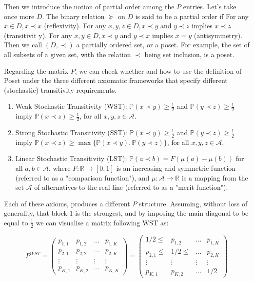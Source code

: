 \documentclass[11pt]{amsart}
\begin{document}
Then we introduce the notion of partial order among the $P$ entries. Let's take once more $D$. The binary relation $\succeq$ on $D$ is said to be a partial order if 
For any $x \in D, x \prec x$ (reflexivity).
For any $x, y, z \in D, x \prec y$ and $y \prec z$ implies $x \prec z$ (transitivit
y).
For any $x, y \in D, x \prec y$ and $y \prec x$ implies $x=y$ (antisymmetry).
Then we call $(D, \prec)$ a partially ordered set, or a poset. For example, the set of all subsets of a given set, with the relation $\prec$ being set inclusion, is a poset.

Regarding the matrix $P$, we can check whether and how to use the definition of Poset under the three different axiomatic frameworks that specify different (stochastic) transitivity requirements.

\begin{enumerate}
\item Weak Stochastic Transitivity (WST): $\mathbb{P}(x \prec y) \geq \frac{1}{2}$ and $\mathbb{P}(y \prec z) \geq \frac{1}{2}$ imply $\mathbb{P}(x \prec z) \geq \frac{1}{2}$, for all $x, y, z \in \mathcal{A}$.

\item Strong Stochastic Transitivity (SST): $\mathbb{P}(x \prec y) \geq \frac{1}{2}$ and $\mathbb{P}(y \prec z) \geq \frac{1}{2}$ imply $\mathbb{P}(x \prec z) \geq \max \{\mathbb{P}(x \prec y), \mathbb{P}(y \prec z)\}$, for all $x, y, z \in \mathcal{A}$.

\item Linear Stochastic Transitivity (LST): $\mathbb{P}(a \prec b) = F(\mu(a) - \mu(b))$ for all $a, b \in \mathcal{A}$, where $F:\mathbb{R} \to [0, 1]$ is an increasing and symmetric function (referred to as a "comparison function"), and $\mu: \mathcal{A} \to \mathbb{R}$ is a mapping from the set $\mathcal{A}$ of alternatives to the real line (referred to as a "merit function").
\end{enumerate}

Each of these axioms, produces a different $P$ structure. Assuming, without loss of generality, that block 1 is the strongest, and by imposing the main diagonal to be equal to $\frac{1}{2}$ we can visualise a matrix following WST as:

\begin{center}
\begin{equation}
\label{eq:WST_P}
P^{WST} = 
\left(\begin{array}{cccc}p_{1,1} & p_{1,2} &  ... & p_{1,K} \\ p_{2,1} & p_{2,2} & ... & p_{2,K} \\ \vdots & \vdots & \vdots & \vdots \\ p_{K,1}& p_{K,2 }& ... & p_{K,K}\end{array}\right) =  
\left(\begin{array}{cccc} 1/2 \leq & p_{1,2} & ... & p_{1,K} \\  p_{2,1} \leq &  1/2 \leq & ... &  p_{2,K}  \\ \vdots & \vdots & \vdots & \vdots \\  p_{K,1}& p_{K,2 }&  ... &  1/2 \end{array}\right) 
\end{equation}
\end{center}
 
\end{document}
